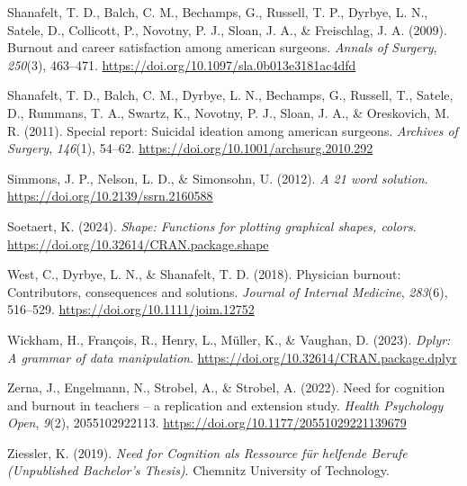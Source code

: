 \documentclass[
  man]{apa6}
\newlength{\cslhangindent}
\newenvironment{CSLReferences}[2] %
 {\begin{list}{}{%
  \setlength{\itemindent}{0pt}
  \setlength{\leftmargin}{0pt}
  \setlength{\parsep}{0pt}
  \ifodd #1
   \setlength{\leftmargin}{\cslhangindent}
   \setlength{\itemindent}{-1\cslhangindent}
  \fi
  \setlength{\itemsep}{#2\baselineskip}}}
 {\end{list}}
\begin{document}
\begin{CSLReferences}{1}{0}
Shanafelt, T. D., Balch, C. M., Bechamps, G., Russell, T. P., Dyrbye, L. N., Satele, D., Collicott, P., Novotny, P. J., Sloan, J. A., \& Freischlag, J. A. (2009). Burnout and career satisfaction among american surgeons. \emph{Annals of Surgery}, \emph{250}(3), 463--471. \url{https://doi.org/10.1097/sla.0b013e3181ac4dfd}

Shanafelt, T. D., Balch, C. M., Dyrbye, L. N., Bechamps, G., Russell, T., Satele, D., Rummans, T. A., Swartz, K., Novotny, P. J., Sloan, J. A., \& Oreskovich, M. R. (2011). Special report: Suicidal ideation among american surgeons. \emph{Archives of Surgery}, \emph{146}(1), 54--62. \url{https://doi.org/10.1001/archsurg.2010.292}

Simmons, J. P., Nelson, L. D., \& Simonsohn, U. (2012). \emph{A 21 word solution}. \url{https://doi.org/10.2139/ssrn.2160588}

Soetaert, K. (2024). \emph{Shape: Functions for plotting graphical shapes, colors}. \url{https://doi.org/10.32614/CRAN.package.shape}

West, C., Dyrbye, L. N., \& Shanafelt, T. D. (2018). Physician burnout: Contributors, consequences and solutions. \emph{Journal of Internal Medicine}, \emph{283}(6), 516--529. \url{https://doi.org/10.1111/joim.12752}

Wickham, H., François, R., Henry, L., Müller, K., \& Vaughan, D. (2023). \emph{Dplyr: A grammar of data manipulation}. \url{https://doi.org/10.32614/CRAN.package.dplyr}

Zerna, J., Engelmann, N., Strobel, A., \& Strobel, A. (2022). Need for cognition and burnout in teachers -- a replication and extension study. \emph{Health Psychology Open}, \emph{9}(2), 2055102922113. \url{https://doi.org/10.1177/20551029221139679}

Ziessler, K. (2019). \emph{{Need for Cognition als Ressource für helfende Berufe} ({Unpublished Bachelor's Thesis})}. Chemnitz University of Technology.

\end{CSLReferences}
\end{document}
